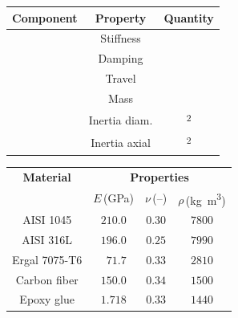 \noindent
\begin{minipage}[c]{0.485\linewidth}
  \centering
  \label{chap4:tab:components}
  \centering
  \small{\begin{tabular}{ccc}
    \toprule
    \textbf{Component} & \textbf{Property} & \textbf{Quantity} \\
    \midrule
    & Stiffness   &  \\
    & Damping     &  \\
    & Travel      &  \\
    \midrule
    & Mass          &  \\
    & Inertia diam. & \textsuperscript{2} \\
    & Inertia axial & \textsuperscript{2} \\
    \bottomrule
  \end{tabular}}
\end{minipage}
\hfill
\begin{minipage}[c]{0.485\linewidth}
  \centering
  \label{chap4:tab:materials}
  \centering
  \small{\begin{tabular}{cccc}
    \toprule
    \multirow{2.5}{*}{\textbf{Material}} & \multicolumn{3}{c}{\textbf{Properties}} \\ \cmidrule(r{4pt}l{4pt}){2-4}
    & $E$\,(\si{\giga\pascal}) & $\nu$\,(--) & $\rho$\,(\si{\kilo\gram\meter}\textsuperscript{3}) \\
    \midrule
    AISI 1045     & $210.0$ & $0.30$ & $7800$ \\
    AISI 316L     & $196.0$ & $0.25$ & $7990$ \\
    Ergal 7075-T6 & $\phantom{1}71.7$ & $0.33$ & $2810$ \\
    Carbon fiber  & $150.0$ & $0.34$ & $1500$ \\
    Epoxy glue    & $1.718$ & $0.33$ & $1440$ \\
    \bottomrule
  \end{tabular}}
\end{minipage}

